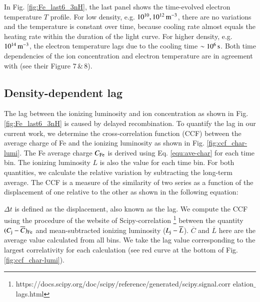 \documentclass{aa}
\begin{document}

In Fig. \ref{fig:Fe_last6_3nH}, the last panel shows the time-evolved electron temperature $T$ profile.
For low density, e.g. $10^{10}, 10^{12} \, \rm m^{-3}$, there are no variations and the temperature is constant over time, because cooling rate almost equals the heating rate within the duration of the light curve.
For higher density, e.g. $10^{14} \, \rm m^{-3}$, the electron temperature lags due to the cooling time $\sim 10^6 \, \rm s$.
Both time dependencies of the ion concentration and electron temperature are in agreement with \cite{Rogantini2022ApJ} (see their Figure $7 \, \& \, 8$).




%










\subsection{ Density-dependent lag}\label{subsect:density-dependent lag}
The lag between the ionizing luminosity and ion concentration as shown in Fig. \ref{fig:Fe_last6_3nH} is caused by delayed recombination.
To quantify the lag in our current work, we determine the cross-correlation function (CCF) between the average charge of Fe and the ionizing luminosity as shown in Fig. \ref{fig:ccf_char-lumi}. 
The Fe average charge $C_{\rm Fe}$ is derived using Eq. \ref{equ:ave-char} for each time bin. 
The ionizing luminosity $L$ is also the value for each time bin.
For both quantities, we calculate the relative variation by subtracting the long-term average.
The CCF is a measure of the similarity of two series as a function of the displacement of one relative to the other as shown in the following equation: 

$\Delta t$ is defined as the displacement, also known as the lag.
We compute the CCF using the procedure of the website of Scipy-correlation \footnote[1]{https://docs.scipy.org/doc/scipy/reference/generated/scipy.signal.corr
elation$\_$lags.html}
between the quantity \( (C_{\rm j} - \overline{C})_{\rm Fe} \) and mean-subtracted ionizing luminosity (\( L_{\rm j} - \overline{L}\)).
$\overline{C}$ and $\overline{L}$ here are the average value calculated from all bins.
We take the lag value corresponding to the largest correlativity for each calculation (see red curve at the bottom of Fig. \ref{fig:ccf_char-lumi}).
\end{document}

